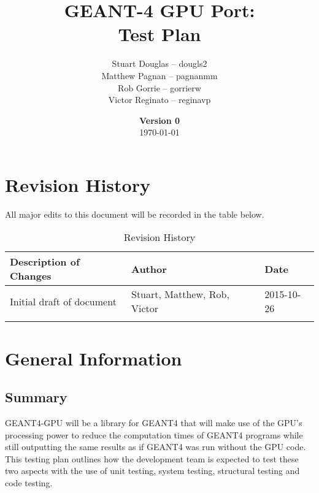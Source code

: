 \documentclass[12pt]{article}
\title{
\LARGE GEANT-4 GPU Port:
\\\vspace{10mm}
\large \textbf{Test Plan}
\vspace{40mm}
}
\author{
Stuart Douglas -- dougls2
\\Matthew Pagnan -- pagnanmm
\\Rob Gorrie -- gorrierw
\\Victor Reginato -- reginavp
\vspace{10mm}
}
\date{\vfill \textbf{Version 0}\\ \today}
\begin{document}

\maketitle
\newpage

\tableofcontents
\newpage
{}
\restoregeometry


\section*{Revision History}
All major edits to this document will be recorded in the table below.

\begin{table}[h]
\centering
\caption{Revision History}
\begin{tabular}{|l|l|l|}
\Xhline{2\arrayrulewidth}
\bf Description of Changes & \bf Author & \bf Date\\\hline
Initial draft of document & Stuart, Matthew, Rob, Victor & 2015-10-26\\
\Xhline{2\arrayrulewidth}
\end{tabular}
\end{table}

\section{General Information}

\subsection{Summary} %
GEANT4-GPU will be a library for GEANT4 that will make use of the GPU's processing power to reduce the computation times of GEANT4 programs while still outputting the same results as if GEANT4 was run without the GPU code. This testing plan outlines how the development team is expected to test these two aspects with the use of unit testing, system testing, structural testing and code testing.

\end{document}
